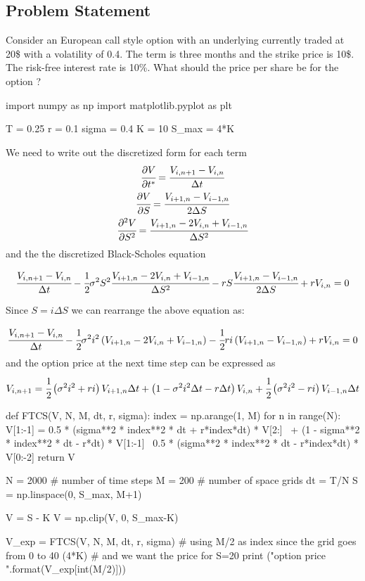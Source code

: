 \subsection{Problem Statement}
Consider an European call style option with an underlying currently traded at 20\$ with a volatility of 0.4. The term is three months and the strike price is 10\$. The risk-free interest rate is 10\%. What should the price per share be for the option ?

\begin{ipython}
import numpy as np
import matplotlib.pyplot as plt

T = 0.25
r = 0.1
sigma = 0.4
K = 10
S_max = 4*K
\end{ipython}

We need to write out the discretized form for each term
\begin{gather}
\cfrac{\partial V}{\partial t^*} = \cfrac{V_{i, n+1}-V_{i, n}}{\Delta t} \\
\cfrac{\partial V}{\partial S} = \cfrac{V_{i+1, n}-V_{i-1, n}}{2\Delta S} \\
\cfrac{\partial^2 V}{\partial S^2} = \cfrac{V_{i+1, n}-2V_{i, n}+V_{i-1, n}}{\Delta S^2}
\end{gather}
and the the discretized Black-Scholes equation

\begin{equation}
\cfrac{V_{i, n+1}-V_{i, n}}{\Delta t} - \cfrac{1}{2}\sigma^2 S^2
\cfrac{V_{i+1, n}-2V_{i, n}+V_{i-1, n}}{\Delta S^2} - rS
\cfrac{V_{i+1,n}-V_{i-1,n}}{2\Delta S} + rV_{i,n} = 0
\end{equation}

Since $S=i\Delta S$ we can rearrange the above equation as:

\begin{equation}
\cfrac{V_{i, n+1}-V_{i, n}}{\Delta t} - \cfrac{1}{2}\sigma^2 i^2
\left(V_{i+1, n}-2V_{i, n}+V_{i-1, n}\right) - \cfrac{1}{2}ri
\left(V_{i+1,n}-V_{i-1,n}\right) + rV_{i,n} = 0
\end{equation}
and the option price at the next time step can be expressed as
\begin{equation}
V_{i, n+1} = \cfrac{1}{2}\left(\sigma^2 i^2+ri\right)V_{i+1,n} \Delta t +
\left(1-\sigma^2 i^2\Delta t-r\Delta t \right)V_{i,n} +
\cfrac{1}{2}\left(\sigma^2 i^2 - ri\right)V_{i-1,n} \Delta t
\end{equation}

\begin{ipython}
def FTCS(V, N, M, dt, r, sigma):
    index = np.arange(1, M)
    for n in range(N):
        V[1:-1] = 0.5 * (sigma**2 * index**2 * dt + r*index*dt) * V[2:] \
             + (1 - sigma**2 * index**2 * dt - r*dt) * V[1:-1] \
                0.5 * (sigma**2 * index**2 * dt - r*index*dt) * V[0:-2]
    return V 
    
N = 2000 # number of time steps
M = 200  # number of space grids
dt = T/N
S = np.linspace(0, S_max, M+1)

V = S - K
V = np.clip(V, 0, S_max-K)

V_exp = FTCS(V, N, M, dt, r, sigma)
# using M/2 as index since the grid goes from 0 to 40 (4*K)
# and we want the price for S=20 
print ("option price {}".format(V_exp[int(M/2)])) 
\end{ipython}

